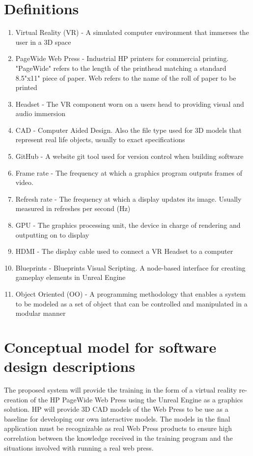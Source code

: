 \documentclass[onecolumn, draftclsnofoot,10pt, compsoc]{IEEEtran}
\begin{document}
\section{Definitions}
\begin{enumerate}
    \item Virtual Reality (VR) - A simulated computer environment that immerses the user in a 3D space
    \item PageWide Web Press - Industrial HP printers for commercial printing. "PageWide" refers to the length of the printhead matching a standard 8.5"x11" piece of paper. Web refers to the name of the roll of paper to be printed
    \item Headset - The VR component worn on a users head to providing visual and audio immersion
    \item CAD - Computer Aided Design. Also the file type used for 3D models that represent real life objects, usually to exact specifications
    \item GitHub - A website git tool used for version control when building software
    \item Frame rate - The frequency at which a graphics program outputs frames of video.
    \item Refresh rate - The frequency at which a display updates its image. Usually measured in refreshes per second (Hz)
    \item GPU - The graphics processing unit, the device in charge of rendering and outputting on to display
    \item HDMI - The display cable used to connect a VR Headset to a computer
    \item Blueprints - Blueprints Visual Scripting. A node-based interface for creating gameplay elements in Unreal Engine
    \item Object Oriented (OO) - A programming methodology that enables a system to be modeled as a set of object that can be controlled and manipulated in a modular manner
    
\end{enumerate}
\section{Conceptual model for software design descriptions}
The proposed system will provide the training in the form of a virtual reality re-creation of the HP PageWide Web Press using the Unreal Engine as a graphics solution. HP will provide 3D CAD models of the Web Press to be use as a baseline for developing our own interactive models. The models in the final application must be recognizable as real Web Press products to ensure high correlation between the knowledge received in the training program and the situations involved with running a real web press.
\end{document}
